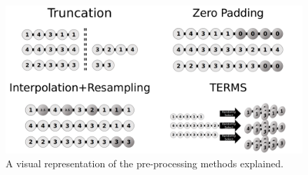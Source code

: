 \begin{figure}[htbp]
\begin{center}
\includegraphics[width=12cm]{images/pre_processing.png}
\end{center}
\caption{A visual representation of the pre-processing methods explained.}
\label{figure:pre_processing}
\end{figure}
